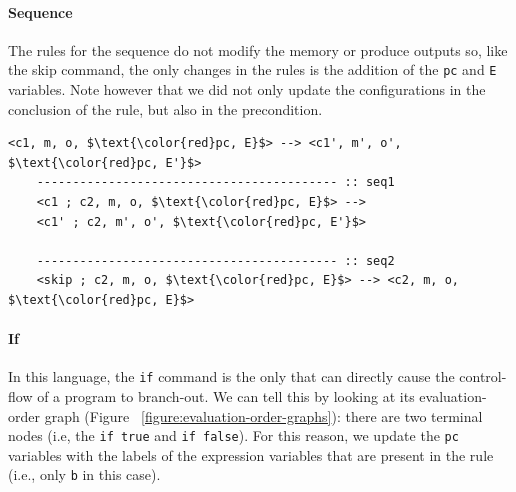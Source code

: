 \documentclass[conference]{IEEEtran}
\begin{document}
\paragraph{Sequence} The rules for the sequence do not modify the memory or produce outputs so, like the skip command, the only changes in the rules is the addition of the \lstinline{pc} and \lstinline{E} variables. Note however that we did not only update the configurations in the conclusion of the rule, but also in the precondition.
\begin{lstlisting}[label=listing:output-semantics-sequence,captionpos=b,caption=Ott-IFC's output for the "sequence" command]
	<c1, m, o, $\text{\color{red}pc, E}$> --> <c1', m', o', $\text{\color{red}pc, E'}$>
	------------------------------------------ :: seq1
	<c1 ; c2, m, o, $\text{\color{red}pc, E}$> --> 
	<c1' ; c2, m', o', $\text{\color{red}pc, E'}$>
	
	------------------------------------------ :: seq2
	<skip ; c2, m, o, $\text{\color{red}pc, E}$> --> <c2, m, o, $\text{\color{red}pc, E}$>
\end{lstlisting}



\paragraph{If}
In this language, the \lstinline{if} command is the only that can directly cause the control-flow of a program to branch-out. We can tell this by looking at its evaluation-order graph (Figure ~\ref{figure:evaluation-order-graphs}): there are two terminal nodes (i.e, the \lstinline{if true} and \lstinline{if false}). For this reason, we update the \lstinline{pc} variables with the labels of the expression variables that are present in the rule (i.e., only \lstinline{b} in this case). 
\end{document}
